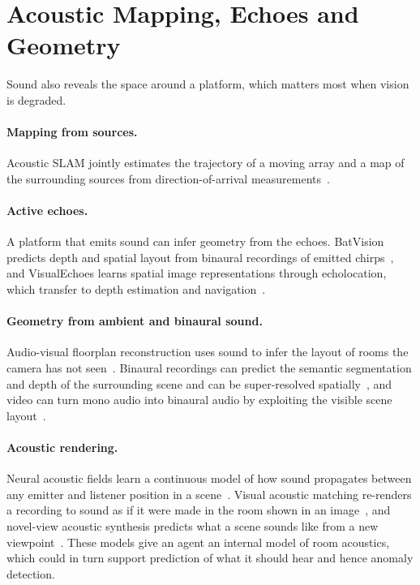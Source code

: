 \section{Acoustic Mapping, Echoes and Geometry}
\label{sec:geometry}

Sound also reveals the space around a platform, which matters most when vision is degraded.

\paragraph{Mapping from sources.}
Acoustic SLAM jointly estimates the trajectory of a moving array and a map of the surrounding sources from direction-of-arrival measurements~\cite{evers2018slam}.

\paragraph{Active echoes.}
A platform that emits sound can infer geometry from the echoes.
BatVision predicts depth and spatial layout from binaural recordings of emitted chirps~\cite{christensen2020batvision}, and VisualEchoes learns spatial image representations through echolocation, which transfer to depth estimation and navigation~\cite{gao2020visualechoes}.

\paragraph{Geometry from ambient and binaural sound.}
Audio-visual floorplan reconstruction uses sound to infer the layout of rooms the camera has not seen~\cite{purushwalkam2021floorplan}.
Binaural recordings can predict the semantic segmentation and depth of the surrounding scene and can be super-resolved spatially~\cite{vasudevan2020binaural}, and video can turn mono audio into binaural audio by exploiting the visible scene layout~\cite{gao2019visualsound}.

\paragraph{Acoustic rendering.}
Neural acoustic fields learn a continuous model of how sound propagates between any emitter and listener position in a scene~\cite{luo2022naf}.
Visual acoustic matching re-renders a recording to sound as if it were made in the room shown in an image~\cite{chen2022vam}, and novel-view acoustic synthesis predicts what a scene sounds like from a new viewpoint~\cite{chen2023nvas}.
These models give an agent an internal model of room acoustics, which could in turn support prediction of what it should hear and hence anomaly detection.
